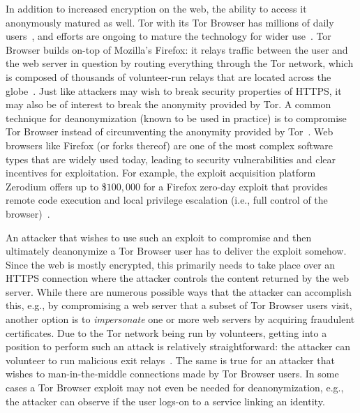 In addition to increased encryption on the web, the ability to access it
anonymously matured as well.  Tor with its Tor Browser has millions of daily
users~\cite{tor,mani}, and efforts are ongoing to mature the technology 
for wider use~\cite{fftor}.  Tor Browser builds on-top of Mozilla's Firefox:
	it relays traffic between the user and the web server in question by routing
		everything through the Tor network,
	which is composed of thousands of volunteer-run relays that are located
		across the globe~\cite{relay-by-flag}.
Just like attackers may wish to break security properties of HTTPS, it may also
be of interest to break the anonymity provided by Tor.  A common technique for
deanonymization (known to be used in practice) is to compromise Tor
Browser instead of circumventing the anonymity provided by
Tor~\cite{selfrando,lepop1,lepop2,zerotor}.  Web browsers like Firefox
(or forks thereof) are one of the most complex software types that are widely
used today, leading to security vulnerabilities and clear incentives for
exploitation.  For example, the exploit acquisition platform Zerodium offers up
to \$$100,000$ for a Firefox zero-day exploit that provides remote code
execution and local privilege escalation (i.e., full control of the
browser)~\cite{zeromain}.

An attacker that wishes to use such an exploit to compromise and then ultimately
deanonymize a Tor Browser user has to deliver the exploit somehow.  Since the
web is mostly encrypted, this primarily needs to take place over an HTTPS
connection where the attacker controls the content returned by the web server.
While there are numerous possible ways that the attacker can accomplish this,
e.g., by compromising a web server that a subset of Tor Browser users visit,
another option is to \emph{impersonate} one or more web servers by acquiring
fraudulent certificates. Due to the Tor network being run by volunteers, getting
into a position to perform such an attack is relatively straightforward:
	the attacker can volunteer to run malicious exit
		relays~\cite{spoiled-onions}.
The same is true for an attacker that wishes to man-in-the-middle connections
made by Tor Browser users.  In some cases a Tor Browser exploit may not even be
needed for deanonymization, e.g., the attacker can observe if the user logs-on
to a service linking an identity.

